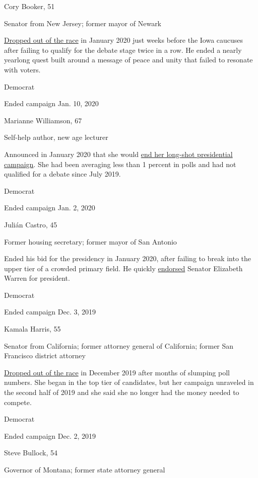 Cory Booker, 51

Senator from New Jersey; former mayor of Newark

\href{https://www.nytimes.com/2020/01/13/us/politics/cory-booker-drops-out.html}{Dropped
out of the race} in January 2020 just weeks before the Iowa caucuses
after failing to qualify for the debate stage twice in a row. He ended a
nearly yearlong quest built around a message of peace and unity that
failed to resonate with voters.

Democrat

Ended campaign Jan. 10, 2020

Marianne Williamson, 67

Self-help author, new age lecturer

Announced in January 2020 that she would
\href{https://www.nytimes.com/2020/01/10/us/politics/marianne-williamson-dropping-out.html}{end
her long-shot presidential campaign}. She had been averaging less than 1
percent in polls and had not qualified for a debate since July 2019.

Democrat

Ended campaign Jan. 2, 2020

Julián Castro, 45

Former housing secretary; former mayor of San Antonio

Ended his bid for the presidency in January 2020, after failing to break
into the upper tier of a crowded primary field. He quickly
\href{https://www.nytimes.com/2020/01/06/us/politics/julian-castro-endorsement-elizabeth-warren.html}{endorsed}
Senator Elizabeth Warren for president.

Democrat

Ended campaign Dec. 3, 2019

Kamala Harris, 55

Senator from California; former attorney general of California; former
San Francisco district attorney

\href{https://www.nytimes.com/2019/12/03/us/politics/kamala-harris-campaign-drops-out.html}{Dropped
out of the race} in December 2019 after months of slumping poll numbers.
She began in the top tier of candidates, but her campaign unraveled in
the second half of 2019 and she said she no longer had the money needed
to compete.

Democrat

Ended campaign Dec. 2, 2019

Steve Bullock, 54

Governor of Montana; former state attorney general

